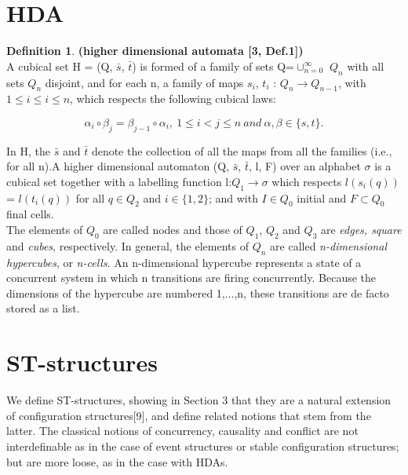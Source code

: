 \documentclass[9pt, english, a4paper]{article}
\theoremstyle{definition}
\newtheorem{definition}{Definition}[section]
\begin{document}
\section{HDA}
	
	\theoremstyle{definition}
	\begin{definition}{\textbf{(higher dimensional automata [3, Def.1])}}\\
		\indent A cubical set H = (Q, $\bar{s}$, $\bar{t}$) is formed of a family of sets Q=$\cup_{n=0}^{\infty}$ $Q_{n}$ with all sets $Q_{n}$ disjoint, and for each n, a family of maps $s_{i}$, $t_{i}$ : $Q_{n} \rightarrow Q_{n-1}$, with $1 \leq i \leq i \leq n$, which respects the following cubical laws:

		\begin{equation}
		\alpha_{i} \circ \beta_{j} = \beta_{j-1} \circ \alpha_{i},\ 1 \leq i < j \leq n\ and\ \alpha, \beta \in \{s,t\}.
		\end{equation}

		\noindent In H, the $\bar{s}$ and $\bar{t}$ denote the collection of all the maps from all the families (i.e., for all n).A higher dimensional automaton (Q, $\bar{s}$, $\bar{t}$, l, F) over an alphabet $\sigma$ is a cubical set together with a labelling function l:$Q_{1} \rightarrow \sigma$ which respects $l(s_{i}(q))$ = $l(t_{i}(q))$ for all $q \in Q_{2}$ and $i \in \{1,2\}$; and with $I \in Q_{0}$ initial and $F \subset Q_{0}$ final cells.\\

		The elements of $Q_{0}$ are called nodes and those of $Q_{1}$, $Q_{2}$ and $Q_{3}$ are \emph{edges, square} and \emph{cubes}, respectively. In general, the elements of $Q_{n}$ are called \emph{n-dimensional hypercubes}, or \emph{n-cells}. An n-dimensional hypercube represents a state of a concurrent system in which n transitions are firing concurrently. Because the dimensions of the hypercube are numbered 1,...,n, these transitions are de facto stored as a list.

	\end{definition}



\section{ST-structures}
	We define ST-structures, showing in Section 3 that they are a natural extension of configuration structures[9], and define related notions that stem from the latter. The classical notions of concurrency, causality and conflict are not interdefinable as in the case of event structures or stable configuration structures; but are more loose, as in the case with HDAs.
\end{document}
